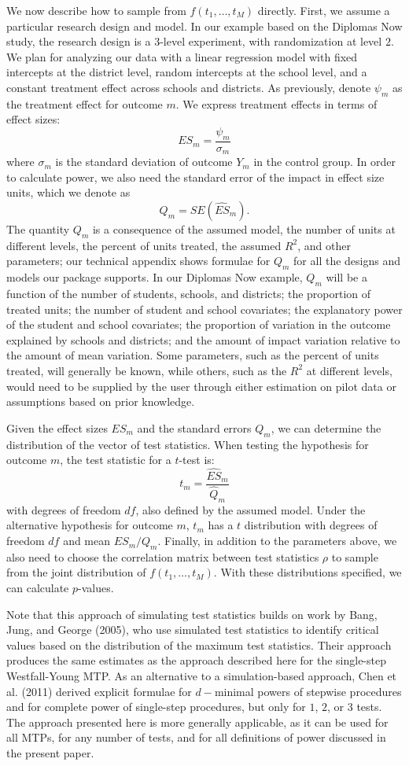 \documentclass[
]{article}
\begin{document}
We now describe how to sample from \(f(t_1, \dots, t_M)\) directly.
First, we assume a particular research design and model. In our example
based on the Diplomas Now study, the research design is a \(3\)-level
experiment, with randomization at level \(2\). We plan for analyzing our
data with a linear regression model with fixed intercepts at the
district level, random intercepts at the school level, and a constant
treatment effect across schools and districts. As previously, denote
\(\psi_m\) as the treatment effect for outcome \(m\). We express
treatment effects in terms of effect sizes:
\[ES_m = \frac{\psi_m}{\sigma_{m}}\] where \(\sigma_{m}\) is the
standard deviation of outcome \(Y_m\) in the control group. In order to
calculate power, we also need the standard error of the impact in effect
size units, which we denote as \[Q_m = SE(\hat{ES}_m).\] The quantity
\(Q_m\) is a consequence of the assumed model, the number of units at
different levels, the percent of units treated, the assumed \(R^2\), and
other parameters; our technical appendix shows formulae for \(Q_m\) for
all the designs and models our package supports. In our Diplomas Now
example, \(Q_m\) will be a function of the number of students, schools,
and districts; the proportion of treated units; the number of student
and school covariates; the explanatory power of the student and school
covariates; the proportion of variation in the outcome explained by
schools and districts; and the amount of impact variation relative to
the amount of mean variation. Some parameters, such as the percent of
units treated, will generally be known, while others, such as the
\(R^2\) at different levels, would need to be supplied by the user
through either estimation on pilot data or assumptions based on prior
knowledge.

Given the effect sizes \(ES_m\) and the standard errors \(Q_m\), we can
determine the distribution of the vector of test statistics. When
testing the hypothesis for outcome \(m\), the test statistic for a
\(t\)-test is: \[t_m = \frac{\hat{ES}_m}{\hat{Q}_m}\] with degrees of
freedom \(df\), also defined by the assumed model. Under the alternative
hypothesis for outcome \(m\), \(t_m\) has a \(t\) distribution with
degrees of freedom \(df\) and mean \(ES_m/Q_m\). Finally, in addition to
the parameters above, we also need to choose the correlation matrix
between test statistics \(\rho\) to sample from the joint distribution
of \(f(t_1, \dots, t_M)\). With these distributions specified, we can
calculate \(p\)-values.

Note that this approach of simulating test statistics builds on work by
Bang, Jung, and George (2005), who use simulated test statistics to
identify critical values based on the distribution of the maximum test
statistics. Their approach produces the same estimates as the approach
described here for the single-step Westfall-Young MTP. As an alternative
to a simulation-based approach, Chen et al. (2011) derived explicit
formulae for \(d-\)minimal powers of stepwise procedures and for
complete power of single-step procedures, but only for \(1\), \(2\), or
\(3\) tests. The approach presented here is more generally applicable,
as it can be used for all MTPs, for any number of tests, and for all
definitions of power discussed in the present paper.
\end{document}
